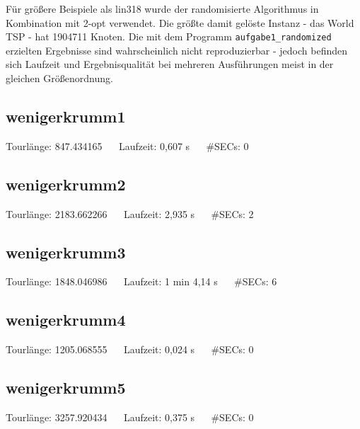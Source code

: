 \documentclass[a4paper, 10pt, ngerman]{article}
\begin{document}
Für größere Beispiele als lin318 wurde der randomisierte Algorithmus in Kombination mit 2-opt verwendet. Die größte damit gelöste Instanz - das World TSP - hat 1904711 Knoten. Die mit dem Programm \verb|aufgabe1_randomized| erzielten Ergebnisse sind wahrscheinlich nicht reproduzierbar - jedoch befinden sich Laufzeit und Ergebnisqualität bei mehreren Ausführungen meist in der gleichen Größenordnung.

\subsection{wenigerkrumm1}



\noindent Tourlänge: 847.434165 $\quad$ Laufzeit: 0,607 s $\quad$ \#SECs: 0

\subsection{wenigerkrumm2}



\noindent Tourlänge: 2183.662266 $\quad$ Laufzeit: 2,935 s $\quad$ \#SECs: 2

\subsection{wenigerkrumm3}



\noindent Tourlänge: 1848.046986 $\quad$ Laufzeit: 1 min 4,14 s $\quad$ \#SECs: 6

\subsection{wenigerkrumm4}



\noindent Tourlänge: 1205.068555 $\quad$ Laufzeit: 0,024 s $\quad$ \#SECs: 0

\subsection{wenigerkrumm5}



\noindent Tourlänge: 3257.920434 $\quad$ Laufzeit: 0,375 s $\quad$ \#SECs: 0
\medskip
\end{document}
